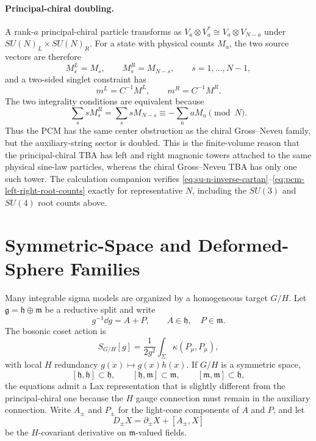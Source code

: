\paragraph{Principal-chiral doubling.}
A rank-\(a\) principal-chiral particle transforms as
\(V_a\otimes V_a^\ast\cong V_a\otimes V_{N-a}\) under
\(SU(N)_L\times SU(N)_R\).  For a state with physical counts \(M_a\), the two
source vectors are therefore
\begin{equation}
  M^L_s=M_s,\qquad M^R_s=M_{N-s},\qquad s=1,\ldots,N-1,
  \label{eq:pcm-left-right-nested-sources}
\end{equation}
and a two-sided singlet constraint has
\begin{equation}
  m^L=C^{-1}M^L,\qquad m^R=C^{-1}M^R .
  \label{eq:pcm-left-right-root-counts}
\end{equation}
The two integrality conditions are equivalent because
\[
  \sum_s sM^R_s=\sum_s sM_{N-s}\equiv-\sum_a aM_a\pmod N.
\]
Thus the PCM has the same center obstruction as the chiral Gross--Neveu
family, but the auxiliary-string sector is doubled.  This is the finite-volume
reason that the principal-chiral TBA has left and right magnonic towers attached
to the same physical sine-law particles, whereas the chiral Gross--Neveu TBA
has only one such tower.  The calculation companion verifies
\eqref{eq:su-n-inverse-cartan}--\eqref{eq:pcm-left-right-root-counts} exactly
for representative \(N\), including the \(SU(3)\) and \(SU(4)\) root counts above.

\section{Symmetric-Space and Deformed-Sphere Families}
\label{sec:integrable-symmetric-super-sausage}

Many integrable sigma models are organized by a homogeneous target \(G/H\).
Let \(\mathfrak g=\mathfrak h\oplus\mathfrak m\) be a reductive split and
write
\[
  g^{-1}\dd g=A+P,\qquad A\in\mathfrak h,\quad P\in\mathfrak m .
\]
The bosonic coset action is
\begin{equation}
  S_{G/H}[g]
  =
  \frac1{2g^2}\int_\Sigma\kappa(P_\mu,P_\mu),
  \label{eq:coset-sigma-action}
\end{equation}
with local \(H\) redundancy \(g(x)\mapsto g(x)h(x)\).  If \(G/H\) is a
symmetric space,
\[
  [\mathfrak h,\mathfrak h]\subset\mathfrak h,\qquad
  [\mathfrak h,\mathfrak m]\subset\mathfrak m,\qquad
  [\mathfrak m,\mathfrak m]\subset\mathfrak h,
\]
the equations admit a Lax representation that is slightly different from the
principal-chiral one because the \(H\) gauge connection must remain in the
auxiliary connection.  Write \(A_\pm\) and \(P_\pm\) for the light-cone
components of \(A\) and \(P\), and let
\[
  D_\pm X=\partial_\pm X+[A_\pm,X]
\]
be the \(H\)-covariant derivative on \(\mathfrak m\)-valued fields.

